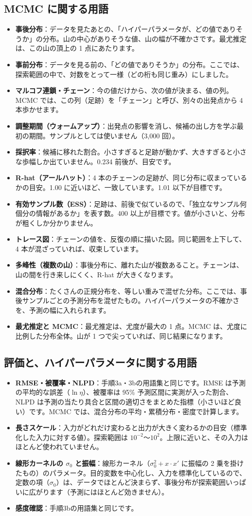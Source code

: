 \documentclass[paper=a4paper,fontsize=10.5pt,line_length=44zw,number_of_lines=38]{jlreq}
\newenvironment{termlist}{\begin{itemize}[label=・,leftmargin=1\zw,labelwidth=1\zw,labelsep=0pt,itemsep=0.4ex,topsep=0.6ex,parsep=0pt]}{\end{itemize}}
\newcommand{\term}[1]{\item \textbf{#1}：}
\begin{document}
\subsection{MCMC に関する用語}
\begin{termlist}
\term{事後分布}データを見たあとの、「ハイパーパラメータが、どの値でありそうか」の分布。山の中心がありそうな値、山の幅が不確かさです。最尤推定は、この山の頂上の 1 点にあたります。
\term{事前分布}データを見る前の、「どの値でありそうか」の分布。ここでは、探索範囲の中で、対数をとって一様（どの桁も同じ重み）にしました。
\term{マルコフ連鎖・チェーン}今の値だけから、次の値が決まる、値の列。MCMC では、この列（足跡）を「チェーン」と呼び、別々の出発点から 4 本歩かせます。
\term{調整期間（ウォームアップ）}出発点の影響を消し、候補の出し方を学ぶ最初の期間。サンプルとしては使いません（3,000 回）。
\term{採択率}候補に移れた割合。小さすぎると足跡が動かず、大きすぎると小さな歩幅しか出ていません。0.234 前後が、目安です。
\term{R-hat（アールハット）}4 本のチェーンの足跡が、同じ分布に収まっているかの目安。1.00 に近いほど、一致しています。1.01 以下が目標です。
\term{有効サンプル数（ESS）}足跡は、前後で似ているので、「独立なサンプル何個分の情報があるか」を表す数。400 以上が目標です。値が小さいと、分布が粗くしか分かりません。
\term{トレース図}チェーンの値を、反復の順に描いた図。同じ範囲を上下して、4 本が混ざっていれば、収束しています。
\term{多峰性（複数の山）}事後分布に、離れた山が複数あること。チェーンは、山の間を行き来しにくく、R-hat が大きくなります。
\term{混合分布}たくさんの正規分布を、等しい重みで混ぜた分布。ここでは、事後サンプルごとの予測分布を混ぜたもの。ハイパーパラメータの不確かさを、予測の幅に入れられます。
\term{最尤推定と MCMC}最尤推定は、尤度が最大の 1 点。MCMC は、尤度に比例した分布全体。山が 1 つで尖っていれば、同じ結果になります。
\end{termlist}

\subsection{評価と、ハイパーパラメータに関する用語}
\begin{termlist}
\term{RMSE・被覆率・NLPD}手順3a・3bの用語集と同じです。RMSE は予測の平均的な誤差（$\ln\eta$）、被覆率は 95\% 予測区間に実測が入った割合、NLPD は予測の当たり具合と区間の適切さをまとめた指標（小さいほど良い）です。MCMC では、混合分布の平均・累積分布・密度で計算します。
\term{長さスケール}入力がどれだけ変わると出力が大きく変わるかの目安（標準化した入力に対する値）。探索範囲は $10^{-2}$〜$10^{2}$。上限に近いと、その入力はほとんど使われていません。
\term{線形カーネルの $\sigma_0$ と振幅}線形カーネル（$\sigma_0^2 + x\cdot x'$ に振幅の 2 乗を掛けたもの）のパラメータ。目的変数を中心化し、入力を標準化しているので、定数の項（$\sigma_0$）は、データでほとんど決まらず、事後分布が探索範囲いっぱいに広がります（予測にはほとんど効きません）。
\term{感度確認}手順3bの用語集と同じです。
\end{termlist}
\end{document}
